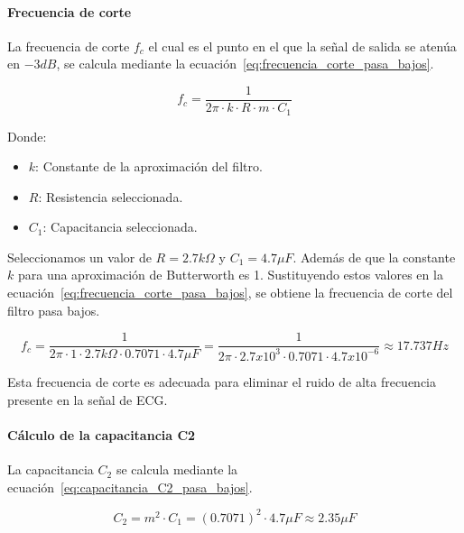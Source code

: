        \paragraph{Frecuencia de corte}
        La frecuencia de corte $f_c$ el cual es el punto en el que la señal de salida se atenúa en $-3 dB$, se calcula mediante la ecuación~\ref{eq:frecuencia_corte_pasa_bajos}.

        \begin{equation}
            \label{eq:frecuencia_corte_pasa_bajos}
            f_c = \frac{1}{2\pi \cdot k \cdot R \cdot m \cdot C_1}
        \end{equation}

        Donde:
        \begin{itemize}
            \item $k$: Constante de la aproximación del filtro.
            \item $R$: Resistencia seleccionada.
            \item $C_1$: Capacitancia seleccionada.
        \end{itemize}

        Seleccionamos un valor de $R = 2.7 k\Omega$ y $C_1 = 4.7 \mu F$. Además de que la constante $k$ para una aproximación de Butterworth es 1. Sustituyendo estos valores en la ecuación~\ref{eq:frecuencia_corte_pasa_bajos}, se obtiene la frecuencia de corte del filtro pasa bajos.

        \begin{equation}
            \label{eq:frecuencia_corte_pasa_bajos_valor}
            f_c = \frac{1}{2\pi \cdot 1 \cdot 2.7 k\Omega \cdot 0.7071\cdot 4.7 \mu F} = \frac{1}{2\pi \cdot 2.7 x10^3 \cdot 0.7071\cdot 4.7 x10^{-6}} \approx 17.737 Hz
        \end{equation}

        Esta frecuencia de corte es adecuada para eliminar el ruido de alta frecuencia presente en la señal de ECG.

        \paragraph{Cálculo de la capacitancia C2}
        La capacitancia $C_2$ se calcula mediante la ecuación~\ref{eq:capacitancia_C2_pasa_bajos}.

        \begin{equation}
            \label{eq:capacitancia_C2_pasa_bajos}
            C_2 = m^2 \cdot C_1 = (0.7071)^2 \cdot 4.7 \mu F \approx 2.35 \mu F
        \end{equation}

